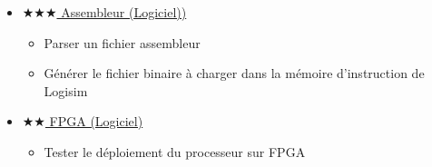 \documentclass{article}
\begin{document}
\begin{itemize}
        \item \hyperref[sec:ASM]{$\bigstar\bigstar\bigstar$ Assembleur (Logiciel))}
        \begin{itemize}
            \item Parser un fichier assembleur
            \item Générer le fichier binaire à charger dans la mémoire d'instruction de Logisim
        \end{itemize}
        \item \hyperref[sec:FPGA]{$\bigstar\bigstar$ FPGA (Logiciel)}
        \begin{itemize}
            \item Tester le déploiement du processeur sur FPGA
        \end{itemize}
    \end{itemize}
\end{document}
